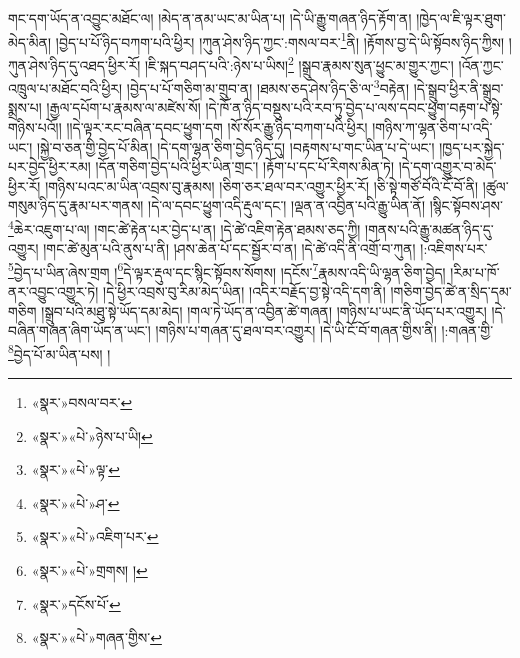 གང་དག་ཡོད་ན་འབྱུང་མཐོང་ལ། །མེད་ན་ནམ་ཡང་མ་ཡིན་པ། །དེ་ཡི་རྒྱུ་གཞན་ཉིད་རྟོག་ན། །ཁྱེད་ལ་ཇི་ལྟར་ཐུག་མེད་མིན། །བྱེད་པ་པོ་ཉིད་བཀག་པའི་ཕྱིར། །ཀུན་ཤེས་ཉིད་ཀྱང་:གསལ་བར་\footnote{«སྣར་»བསལ་བར་}ནི། །རྟོགས་བྱ་དེ་ཡི་སྟོབས་ཉིད་ཀྱིས། །ཀུན་ཤེས་ཉིད་དུ་འཐད་ཕྱིར་རོ། །ཇི་སྐད་བཤད་པའི་:ཉེས་པ་ཡིས།\footnote{«སྣར་»«པེ་»ཉེས་པ་ཡི།} །སྒྲུབ་རྣམས་སུན་ཕྱུང་མ་གྱུར་ཀྱང་། །འོན་ཀྱང་འཁྲུལ་པ་མཐོང་བའི་ཕྱིར། །བྱེད་པ་པོ་གཅིག་མ་གྲུབ་ན། །ཐམས་ཅད་ཤེས་ཉིད་ཅི་ལ་\footnote{«སྣར་»«པེ་»ལྟ་}བརྟེན། །དེ་སྒྲུབ་ཕྱིར་ནི་སྒྲུབ་སྨྲས་པ། །རྒྱལ་དཔོག་པ་རྣམས་ལ་མཛེས་སོ། །དེ་ཁོ་ན་ཉིད་བསྡུས་པའི་རབ་ཏུ་བྱེད་པ་ལས་དབང་ཕྱུག་བརྟག་པ་སྟེ་གཉིས་པའོ།། །།དེ་ལྟར་རང་བཞིན་དབང་ཕྱུག་དག །སོ་སོར་རྒྱུ་ཉིད་བཀག་པའི་ཕྱིར། །གཉིས་ཀ་ལྷན་ཅིག་པ་འདི་ཡང་། །སྐྱེ་བ་ཅན་གྱི་བྱེད་པོ་མིན། །དེ་དག་ལྷན་ཅིག་བྱེད་ཉིད་དུ། །བརྟགས་པ་གང་ཡིན་པ་དེ་ཡང་། །ཁྱད་པར་སྐྱེད་པར་བྱེད་ཕྱིར་རམ། །དོན་གཅིག་བྱེད་པའི་ཕྱིར་ཡིན་གྲང་། །རྟོག་པ་དང་པོ་རིགས་མིན་ཏེ། །དེ་དག་འགྱུར་བ་མེད་ཕྱིར་རོ། །གཉིས་པའང་མ་ཡིན་འབྲས་བུ་རྣམས། །ཅིག་ཅར་ཐལ་བར་འགྱུར་ཕྱིར་རོ། །ཅི་སྟེ་གཙོ་བོའི་ངོ་བོ་ནི། །ཚུལ་གསུམ་ཉིད་དུ་རྣམ་པར་གནས། །དེ་ལ་དབང་ཕྱུག་འདི་རྡུལ་དང་། །ལྡན་ན་འབྱིན་པའི་རྒྱུ་ཡིན་ནོ། །སྙིང་སྟོབས་ཤས་\footnote{«སྣར་»«པེ་»ཤ་}ཆེར་འཇུག་པ་ལ། །གང་ཚེ་རྟེན་པར་བྱེད་པ་ན། །དེ་ཚེ་འཇིག་རྟེན་ཐམས་ཅད་ཀྱི། །གནས་པའི་རྒྱུ་མཚན་ཉིད་དུ་འགྱུར། །གང་ཚེ་མུན་པའི་ནུས་པ་ནི། །ཤས་ཆེན་པོ་དང་སྦྱོར་བ་ན། །དེ་ཚེ་འདི་ནི་འགྲོ་བ་ཀུན། །:འཇིགས་པར་\footnote{«སྣར་»«པེ་»འཇིག་པར་}བྱེད་པ་ཡིན་ཞེས་གྲག །\footnote{«སྣར་»«པེ་»གྲགས། །}དེ་ལྟར་རྡུལ་དང་སྙིང་སྟོབས་སོགས། །དངོས་\footnote{«སྣར་»དངོས་པོ་}རྣམས་འདི་ཡི་ལྷན་ཅིག་བྱེད། །རིམ་པ་ཁོ་ནར་འབྱུང་འགྱུར་ཏེ། །དེ་ཕྱིར་འབྲས་བུ་རིམ་མེད་ཡིན། །འདིར་བརྗོད་བྱ་སྟེ་འདི་དག་ནི། །གཅིག་བྱེད་ཚེ་ན་སྲིད་དམ་གཅིག །སྒྲུབ་པའི་མཐུ་སྟེ་ཡོད་དམ་མེད། །གལ་ཏེ་ཡོད་ན་འབྱིན་ཚེ་གཞན། །གཉིས་པ་ཡང་ནི་ཡོད་པར་འགྱུར། །དེ་བཞིན་གཞན་ཞིག་ཡོད་ན་ཡང་། །གཉིས་པ་གཞན་དུ་ཐལ་བར་འགྱུར། །དེ་ཡི་ངོ་བོ་གཞན་གྱིས་ནི། །:གཞན་གྱི་\footnote{«སྣར་»«པེ་»གཞན་གྱིས་}བྱེད་པོ་མ་ཡིན་པས། །
